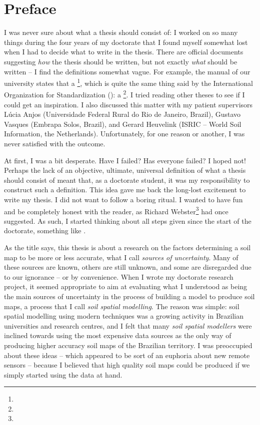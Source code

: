 \chapter*{Preface}

I was never sure about what a thesis should consist of: I worked on so many things during the four years of my 
doctorate that I found myself somewhat lost when I had to decide what to write in the thesis. There are 
official documents suggesting \emph{how} the thesis should be written, but not exactly \emph{what} should be 
written -- I find the definitions somewhat vague. For example, the manual of our university states that a 
\footnote{}, which is quite the same thing said by the International 
Organization for Standardization (\iso): a \footnote{}. I tried reading other theses to see if I could get an 
inspiration. I also discussed this matter with my patient supervisors Lúcia Anjos (Universidade Federal Rural 
do Rio de Janeiro, Brazil), Gustavo Vasques (Embrapa Solos, Brazil), and Gerard Heuvelink (ISRIC -- World Soil 
Information, the Netherlands). Unfortunately, for one reason or another, I was never satisfied with the 
outcome.

At first, I was a bit desperate. Have I failed? Has everyone failed? I hoped not! Perhaps the lack of an 
objective, ultimate, universal definition of what a thesis should consist of meant that, as a doctorate 
student, it was my responsibility to construct such a definition. This idea gave me back the long-lost 
excitement to write my thesis. I did not want to follow a boring ritual. I wanted to have fun and be completely 
honest with the reader, as Richard Webster\footnote{} had once suggested. 
As such, I started thinking about all steps given since the start of the doctorate, something like .

As the title says, this thesis is about a research on the factors determining a soil map to be more or less 
accurate, what I call \emph{sources of uncertainty}. Many of these sources are known, others are still unknown, 
and some are disregarded due to our ignorance -- or by convenience. When I wrote my doctorate research project, 
it seemed appropriate to aim at evaluating what I understood as being the main sources of uncertainty in the 
process of building a model to produce soil maps, a process that I call \emph{soil spatial modelling}. The 
reason was simple: soil spatial modelling using modern techniques was a growing activity in Brazilian 
universities and research centres, and I felt that many \emph{soil spatial modellers} were inclined towards 
using the most expensive data sources as the only way of producing higher accuracy soil maps of the Brazilian 
territory. I was preoccupied about these ideas -- which appeared to be sort of an euphoria about new remote 
sensors -- because I believed that high quality soil maps could be produced if we simply started using the data 
at hand.

